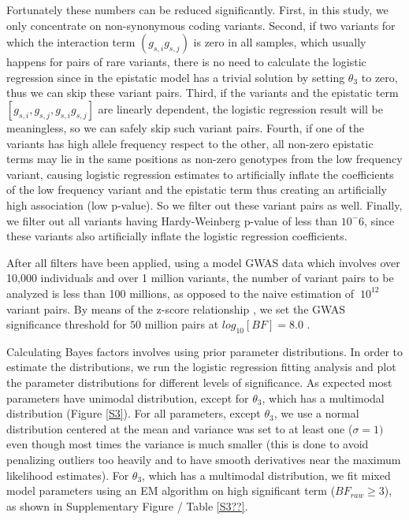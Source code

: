 Fortunately these numbers can be reduced significantly. First, in this study, we only concentrate on non-synonymous coding variants. Second, if two variants for which the interaction term $(g_{s,i} g_{s,j})$ is zero in all samples, which usually happens for pairs of rare variants, there is no need to calculate the logistic regression since in the epistatic model has a trivial solution by setting $\theta_3$ to zero, thus we can skip these variant pairs. Third, if the variants and the epistatic term $[g_{s,i}, g_{s,j}, g_{s,i} g_{s,j}]$ are linearly dependent, the logistic regression result will be meaningless, so we can safely skip such variant pairs. Fourth, if one of the variants has high allele frequency respect to the other, all non-zero epistatic terms may lie in the same positions as non-zero genotypes from the low frequency variant, causing logistic regression estimates to artificially inflate the coefficients of the low frequency variant and the epistatic term thus creating an artificially high association (low p-value). So we filter out these variant pairs as well. Finally, we filter out all variants having Hardy-Weinberg p-value of less than $10^-6$, since these variants also artificially inflate the logistic regression coefficients. 

After all filters have been applied, using a model GWAS data  which involves over 10,000 individuals and over 1 million variants, the number of variant pairs to be analyzed is less than 100 millions, as opposed to the naive estimation of $~10^{12}$ variant pairs. By means of the z-score relationship \cite{Goodman}, we set the GWAS significance threshold for $50$ million pairs at $log_{10}[BF] =  8.0$ .

Calculating Bayes factors involves using prior parameter distributions. In order to estimate the distributions, we run the logistic regression fitting analysis and plot the parameter distributions for different levels of significance. As expected most parameters have unimodal distribution, except for $\theta_3$, which has a multimodal distribution (Figure \ref{S3}). For all parameters, except $\theta_3$, we use a normal distribution centered at the mean and variance was set to at least one ($\sigma=1)$ even though most times the variance is much smaller (this is done to avoid penalizing outliers too heavily and to have smooth derivatives near the maximum likelihood estimates). For $\theta_3$, which has a multimodal distribution, we fit mixed model parameters using an EM algorithm on high significant term ($BF_{raw} \ge 3$), as shown in Supplementary Figure / Table \ref{S3??}.

